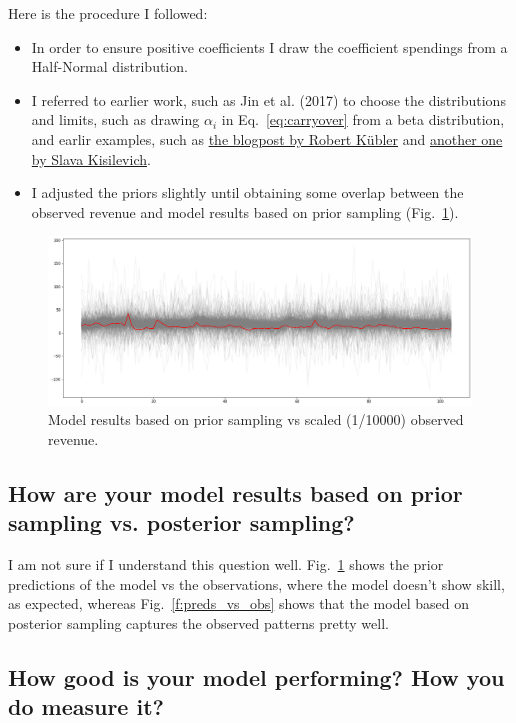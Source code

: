 \documentclass[a4paper,10pt]{scrartcl}
\begin{document}
Here is the procedure I followed:
\begin{itemize}
 \item In order to ensure positive coefficients I draw the coefficient spendings from a Half-Normal distribution.
 \item I referred to earlier work, such as Jin et al. (2017) to choose the distributions and limits, such as drawing $\alpha_i$ in Eq.~\ref{eq:carryover} from a beta distribution, and earlir examples, such as \href{https://towardsdatascience.com/bayesian-marketing-mix-modeling-in-python-via-pymc3-7b2071f6001a}{the blogpost by Robert Kübler} and \href{https://towardsdatascience.com/modeling-marketing-mix-using-pymc3-ba18dd9e6e68}{another one by Slava Kisilevich}.
 \item I adjusted the priors slightly until obtaining some overlap between the observed revenue and model results based on prior sampling (Fig.~\ref{f:pred_prior}).
\end{itemize}

 
\begin{figure}[!h]
  \centering
  \includegraphics[trim=0mm 0mm 0mm 0mm, clip, width=.8\textwidth]{Prior_prediction.png}
  \caption{Model results based on prior sampling vs scaled (1/10000) observed revenue.}\label{f:pred_prior}
\end{figure}

\FloatBarrier

\subsection {How are your model results based on prior sampling vs. posterior sampling?}
I am not sure if I understand this question well. Fig.~\ref{f:pred_prior} shows the prior predictions of the model vs the observations, where the model doesn't show skill, as expected, whereas Fig.~\ref{f:preds_vs_obs} shows that the model based on posterior sampling captures the observed patterns pretty well.

\subsection {How good is your model performing? How you do measure it?}
\end{document}
